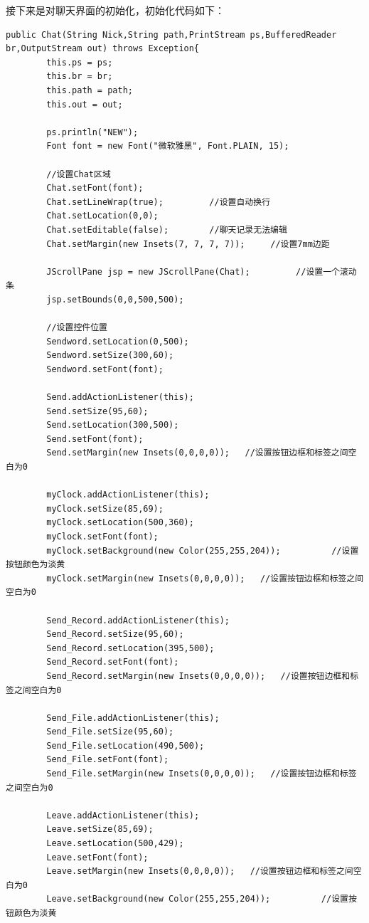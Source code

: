 \documentclass[UTF8,12pt]{article}
\begin{document}
接下来是对聊天界面的初始化，初始化代码如下：
\begin{lstlisting}[title=聊天界面的初始化,frame=shadowbox]
    public Chat(String Nick,String path,PrintStream ps,BufferedReader br,OutputStream out) throws Exception{
        this.ps = ps;
        this.br = br;
        this.path = path;
        this.out = out;

        ps.println("NEW");
        Font font = new Font("微软雅黑", Font.PLAIN, 15);

        //设置Chat区域
        Chat.setFont(font);
        Chat.setLineWrap(true);         //设置自动换行
        Chat.setLocation(0,0);
        Chat.setEditable(false);        //聊天记录无法编辑
        Chat.setMargin(new Insets(7, 7, 7, 7));     //设置7mm边距

        JScrollPane jsp = new JScrollPane(Chat);         //设置一个滚动条
        jsp.setBounds(0,0,500,500);

        //设置控件位置
        Sendword.setLocation(0,500);
        Sendword.setSize(300,60);
        Sendword.setFont(font);

        Send.addActionListener(this);
        Send.setSize(95,60);
        Send.setLocation(300,500);
        Send.setFont(font);
        Send.setMargin(new Insets(0,0,0,0));   //设置按钮边框和标签之间空白为0

        myClock.addActionListener(this);
        myClock.setSize(85,69);
        myClock.setLocation(500,360);
        myClock.setFont(font);
        myClock.setBackground(new Color(255,255,204));          //设置按钮颜色为淡黄
        myClock.setMargin(new Insets(0,0,0,0));   //设置按钮边框和标签之间空白为0

        Send_Record.addActionListener(this);
        Send_Record.setSize(95,60);
        Send_Record.setLocation(395,500);
        Send_Record.setFont(font);
        Send_Record.setMargin(new Insets(0,0,0,0));   //设置按钮边框和标签之间空白为0

        Send_File.addActionListener(this);
        Send_File.setSize(95,60);
        Send_File.setLocation(490,500);
        Send_File.setFont(font);
        Send_File.setMargin(new Insets(0,0,0,0));   //设置按钮边框和标签之间空白为0

        Leave.addActionListener(this);
        Leave.setSize(85,69);
        Leave.setLocation(500,429);
        Leave.setFont(font);
        Leave.setMargin(new Insets(0,0,0,0));   //设置按钮边框和标签之间空白为0
        Leave.setBackground(new Color(255,255,204));          //设置按钮颜色为淡黄


\end{lstlisting}
\end{document}
